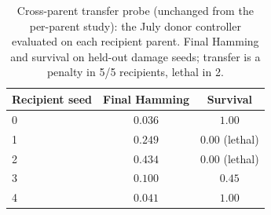 \documentclass{article}
\begin{document}
\begin{table}[h]
\centering
\small
\caption{Cross-parent transfer probe (unchanged from the per-parent
study): the July donor controller evaluated on each recipient parent.
Final Hamming and survival on held-out damage seeds; transfer is a
penalty in 5/5 recipients, lethal in 2.}
\label{tab:transfer}
\begin{tabular}{lcc}
\toprule
Recipient seed & Final Hamming & Survival \\
\midrule
0 & $0.036$ & $1.00$ \\
1 & $0.249$ & $0.00$ (lethal) \\
2 & $0.434$ & $0.00$ (lethal) \\
3 & $0.100$ & $0.45$ \\
4 & $0.041$ & $1.00$ \\
\bottomrule
\end{tabular}
\end{table}
\end{document}
